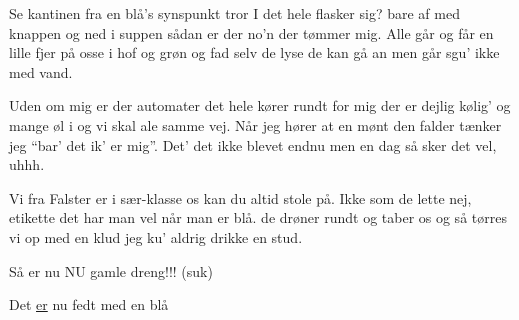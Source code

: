 \documentclass[a4paper,11pt]{article}
\begin{document}
\begin{song}
%
Se kantinen fra en blå's synspunkt
tror I det hele flasker sig?
bare af med knappen
og ned i suppen
sådan er der no'n der tømmer mig.
Alle går og får en lille fjer på
osse i hof og grøn og fad
selv de lyse de kan gå an
men går sgu' ikke med vand.

Uden om mig er der automater
det hele kører rundt for mig
der er dejlig kølig'
og mange øl i
og vi skal ale samme vej.
Når jeg hører at en mønt den falder
tænker jeg ``bar' det ik' er mig''.
Det' det ikke blevet endnu
men en dag så sker det vel, uhhh.

Vi fra Falster er i sær-klasse
os kan du altid stole på.
Ikke som de lette
nej, etikette det har man vel når man er blå.
de drøner rundt og taber os
og så tørres vi op med en klud
jeg ku' aldrig drikke en stud.


 Så er nu NU gamle dreng!!! (suk) 


 Det \underline{er} nu fedt med en blå
\end{song}
\end{document}
